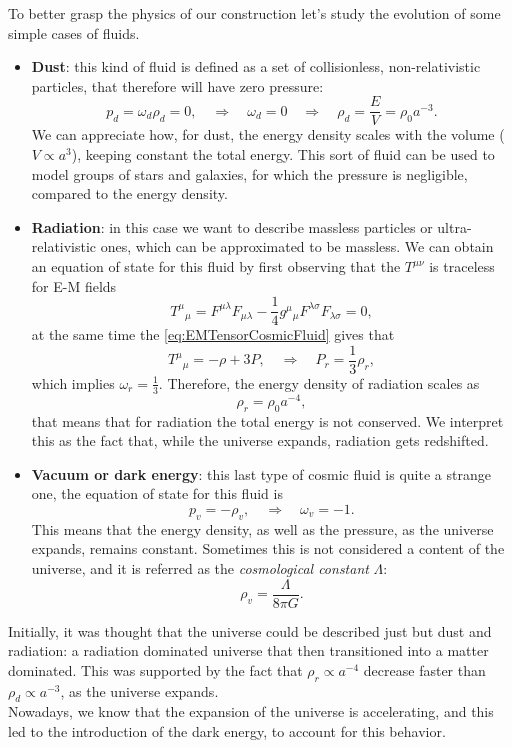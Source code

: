 To better grasp the physics of our construction let's study the evolution of some simple cases of fluids.
\begin{itemize}
    \item \textbf{Dust}: this kind of fluid is defined as a set of collisionless, non-relativistic particles, that therefore will have zero pressure:$$p_d=\omega_d\rho_d=0,\quad\Rightarrow\quad \omega_d=0\quad\Rightarrow\quad\rho_d=\frac{E}{V}=\rho_{0}a^{-3}.$$ We can appreciate how, for dust, the energy density scales with the volume ($V \propto  a^3$), keeping constant the total energy. This sort of fluid can be used to model groups of stars and galaxies, for which the pressure is negligible, compared to the energy density.
    \item \textbf{Radiation}: in this case we want to describe massless particles or ultra-relativistic ones, which can be approximated to be massless. We can obtain an equation of state for this fluid by first observing that the $T^{\mu\nu}$ is traceless for E-M fields $$T^\mu\phantom{}_\mu=F^{\mu\lambda}F_{\mu\lambda}-\frac{1}{4}g^\mu\phantom{}_\mu F^{\lambda\sigma}F_{\lambda\sigma}=0,$$ at the same time the \eqref{eq:EMTensorCosmicFluid} gives that $$T^\mu\phantom{}_\mu=-\rho+3P,\quad\Rightarrow\quad P_r=\frac{1}{3}\rho_r,$$ which implies $\omega_r=\frac{1}{3}$. Therefore, the energy density of radiation scales as$$\rho_r=\rho_0a^{-4},$$ that means that for radiation the total energy is not conserved. We interpret this as the fact that, while the universe expands, radiation gets redshifted.
    \item \textbf{Vacuum or dark energy}: this last type of cosmic fluid is quite a strange one, the equation of state for this fluid is $$p_v=-\rho_v,\quad \Rightarrow\quad \omega_v=-1.$$ This means that the energy density, as well as the pressure, as the universe expands, remains constant. Sometimes this is not considered a content of the universe, and it is referred as the \emph{cosmological constant} $\Lambda$: $$\rho_v=\frac{\Lambda}{8\pi G}.$$
\end{itemize}
Initially, it was thought that the universe could be described just but dust and radiation: a radiation dominated universe that then transitioned into a matter dominated. This was supported by the fact that $\rho_r\propto a^{-4}$ decrease faster than $\rho_d\propto a^{-3}$, as the universe expands.\\ Nowadays, we know that the expansion of the universe is accelerating, and this led to the introduction of the dark energy, to account for this behavior.
